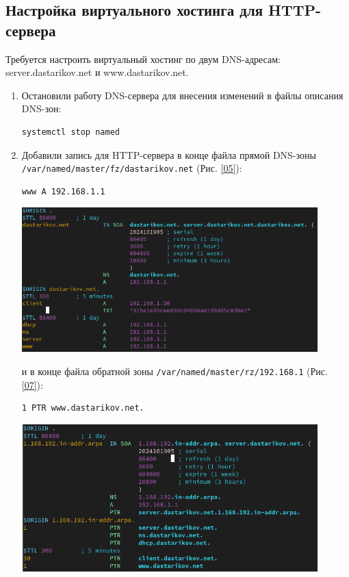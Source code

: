 \subsection{Настройка виртуального хостинга для HTTP-сервера}
Требуется настроить виртуальный хостинг по двум DNS-адресам: server.dastarikov.net и www.dastarikov.net.
\begin{enumerate}
\item Остановили работу DNS-сервера для внесения изменений в файлы описания DNS-зон:
\begin{verbatim}
systemctl stop named
\end{verbatim}
\item Добавили запись для HTTP-сервера в конце файла прямой DNS-зоны \break \texttt{/var/named/master/fz/dastarikov.net} (Рис. \ref{05}):
\begin{verbatim}
www A 192.168.1.1
\end{verbatim}

\begin{center}
    \centering
    \includegraphics[width=0.9\textwidth]{../images/image05.png}
    \label{05}
\end{center}

и в конце файла обратной зоны \texttt{/var/named/master/rz/192.168.1} (Рис. \ref{07}):
\begin{verbatim}
1 PTR www.dastarikov.net.
\end{verbatim}

\begin{center}
    \centering
    \includegraphics[width=0.9\textwidth]{../images/image07.png}
    \label{07}
\end{center}


\end{enumerate}
